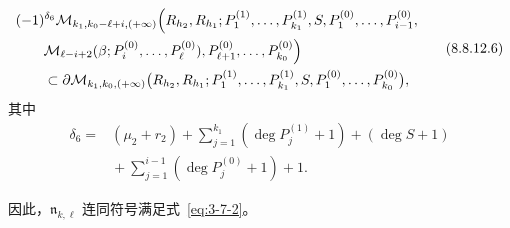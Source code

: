 \begin{equation}
\begin{aligned}
 &(-1)^{\delta_6}
 \mathcal M_{k_1,k_0-\ell+i,(+\infty)}
 \Bigl(
 R_{h_2},R_{h_1};
 P_1^{(1)},\ldots,P_{k_1}^{(1)},
 S,P_1^{(0)},\ldots,P_{i-1}^{(0)},\\
 &\qquad
 \mathcal M_{\ell-i+2}
 (\beta;P_i^{(0)},\ldots,P_\ell^{(0)}),
 P_{\ell+1}^{(0)},\ldots,P_{k_0}^{(0)}
 \Bigr)\\
 &\qquad\subset
 \partial\mathcal M_{k_1,k_0,(+\infty)}
 \bigl(
 R_{h_2},R_{h_1};
 P_1^{(1)},\ldots,P_{k_1}^{(1)},
 S,P_1^{(0)},\ldots,P_{k_0}^{(0)}
 \bigr),
\end{aligned}
\tag{8.8.12.6}\label{eq:8-8-12-6}
\end{equation}
其中
\[
\begin{aligned}
 \delta_6={}&
 (\mu_2+r_2)
 +\sum_{j=1}^{k_1}(\deg P_j^{(1)}+1)
 +(\deg S+1)\\
 &{}+\sum_{j=1}^{i-1}(\deg P_j^{(0)}+1)+1.
\end{aligned}
\]

因此，$\mathfrak n_{k,\ell}$ 连同符号满足式~\eqref{eq:3-7-2}。
